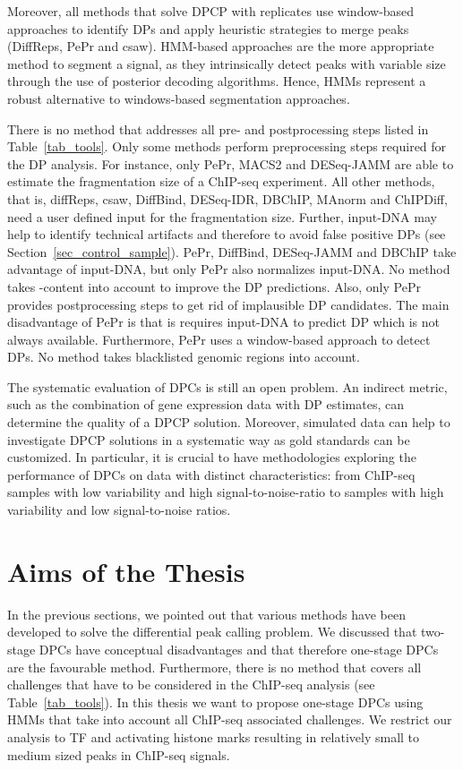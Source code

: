 Moreover, all methods that solve DPCP with replicates use window-based approaches to identify DPs and apply heuristic strategies to merge peaks (DiffReps, PePr and csaw). 
HMM-based approaches are the more appropriate method to segment a signal, as they intrinsically detect peaks with variable size through the use of posterior decoding algorithms.
Hence, HMMs represent a robust alternative to windows-based segmentation approaches.

There is no method that addresses all pre- and postprocessing steps listed in Table~\ref{tab_tools}.
Only some methods perform preprocessing steps required for the DP analysis.
For instance, only PePr, MACS2 and DESeq-JAMM are able to estimate the fragmentation size of a ChIP-seq experiment.
All other methods, that is, diffReps, csaw, DiffBind, DESeq-IDR, DBChIP, MAnorm and ChIPDiff, need a user defined input for the fragmentation size.
Further, input-DNA may help to identify technical artifacts and therefore to avoid false positive DPs (see Section~\ref{sec_control_sample}). 
PePr, DiffBind, DESeq-JAMM and DBChIP take advantage of input-DNA, but only PePr also normalizes input-DNA.
No method takes -content into account to improve the DP predictions.
Also, only PePr provides postprocessing steps to get rid of implausible DP candidates. 
The main disadvantage of PePr is that is requires input-DNA to predict DP which is not always available.
Furthermore, PePr uses a window-based approach to detect DPs.
No method takes blacklisted genomic regions into account.

The systematic evaluation of DPCs is still an open problem.
An indirect metric, such as the combination of gene expression data with DP estimates, can determine the quality of a DPCP solution.
Moreover, simulated data can help to investigate DPCP solutions in a systematic way as gold standards can be customized.
In particular, it is crucial to have methodologies exploring the performance of DPCs on data with distinct characteristics: from ChIP-seq samples with low variability and high signal-to-noise-ratio to samples with high variability and low signal-to-noise ratios.


\section{Aims of the Thesis}
\label{sec_aims}
In the previous sections, we pointed out that various methods have been developed to solve the differential peak calling problem.
We discussed that two-stage DPCs have conceptual disadvantages and that therefore one-stage DPCs are the favourable method.
Furthermore, there is no method that covers all challenges that have to be considered in the ChIP-seq analysis (see Table~\ref{tab_tools}).
In this thesis we want to propose one-stage DPCs using HMMs that take into account all ChIP-seq associated challenges. 
We restrict our analysis to TF and activating histone marks resulting in relatively small to medium sized peaks in ChIP-seq signals.

